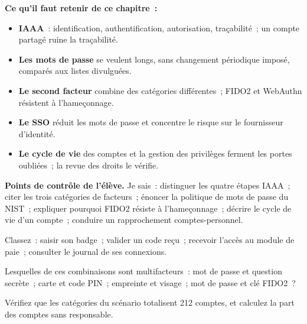 \separateur

\begin{boxresume}
\textbf{Ce qu'il faut retenir de ce chapitre~:}
\begin{itemize}
    \item \textbf{IAAA}~: identification, authentification, autorisation,
          traçabilité~; un compte partagé ruine la traçabilité.
    \item \textbf{Les mots de passe} se veulent longs, sans changement
          périodique imposé, comparés aux listes divulguées.
    \item \textbf{Le second facteur} combine des catégories différentes~;
          FIDO2 et WebAuthn résistent à l'hameçonnage.
    \item \textbf{Le SSO} réduit les mots de passe et concentre le risque
          sur le fournisseur d'identité.
    \item \textbf{Le cycle de vie} des comptes et la gestion des privilèges
          ferment les portes oubliées~; la revue des droits le vérifie.
\end{itemize}
\end{boxresume}

\begin{boxinfo}
\textbf{Points de contrôle de l'élève.} Je sais~: distinguer les quatre
étapes IAAA~; citer les trois catégories de facteurs~; énoncer la
politique de mots de passe du NIST~; expliquer pourquoi FIDO2 résiste à
l'hameçonnage~; décrire le cycle de vie d'un compte~; conduire un
rapprochement comptes-personnel.
\end{boxinfo}

\bigskip

\begin{boxexo}[title={\ding{45}\quad Exercice~17.1. IAAA \niveaubase}]
Classez~: saisir son badge~; valider un code reçu~; recevoir l'accès au
module de paie~; consulter le journal de ses connexions.
\end{boxexo}

\begin{boxexo}[title={\ding{45}\quad Exercice~17.2. Multifacteur~? \niveaubase}]
Lesquelles de ces combinaisons sont multifacteurs~: mot de passe et
question secrète~; carte et code PIN~; empreinte et visage~; mot de passe
et clé FIDO2~?
\end{boxexo}

\begin{boxexo}[title={\ding{45}\quad Exercice~17.3. Les chiffres de la revue \niveaubase}]
Vérifiez que les catégories du scénario totalisent 212 comptes, et
calculez la part des comptes sans responsable.
\end{boxexo}

